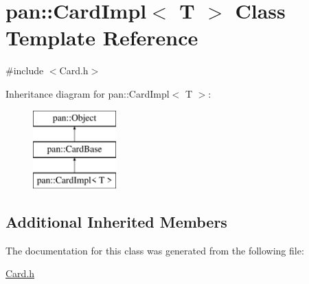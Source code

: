 \hypertarget{classpan_1_1_card_impl}{}\section{pan\+:\+:Card\+Impl$<$ T $>$ Class Template Reference}
\label{classpan_1_1_card_impl}


{\ttfamily \#include $<$Card.\+h$>$}

Inheritance diagram for pan\+:\+:Card\+Impl$<$ T $>$\+:\begin{figure}[H]
\begin{center}
\leavevmode
\includegraphics[height=3.000000cm]{classpan_1_1_card_impl}
\end{center}
\end{figure}
\subsection*{Additional Inherited Members}


The documentation for this class was generated from the following file\+:\begin{DoxyCompactItemize}
\item 
\hyperlink{_card_8h}{Card.\+h}\end{DoxyCompactItemize}
